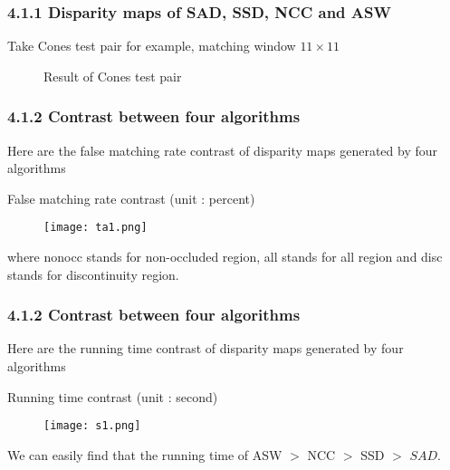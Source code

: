 \documentclass{beamer}
\begin{document}
\begin{frame}
\frametitle{4.1.1 Disparity maps of SAD, SSD, NCC and ASW}
Take Cones test pair for example, matching window $11\times11$

\begin{figure}
\centering
{}
\caption{Result of Cones test pair}
\end{figure}
\end{frame}


\begin{frame}
\frametitle{4.1.2 Contrast between four algorithms}
\raggedright Here are the false matching rate contrast of disparity maps generated by four algorithms

\begin{table}
\caption{False matching rate contrast (unit : percent)}
\begin{figure}[!htp]
\centering \texttt{[image: ta1.png]}
\end{figure}
\end{table}
where nonocc stands for non-occluded region, all stands for all region and disc stands for discontinuity region.

\end{frame}

\begin{frame}
\frametitle{4.1.2 Contrast between four algorithms}
\raggedright Here are the running time contrast of disparity maps generated by four algorithms

\begin{table}
\caption{Running time contrast (unit : second)}
\begin{figure}[!htp]
\centering \texttt{[image: s1.png]}
\end{figure}
\end{table}

We can easily find that the running time of ASW $>$ NCC $>$ SSD $>$ $SAD$.
\end{frame}
\end{document}
